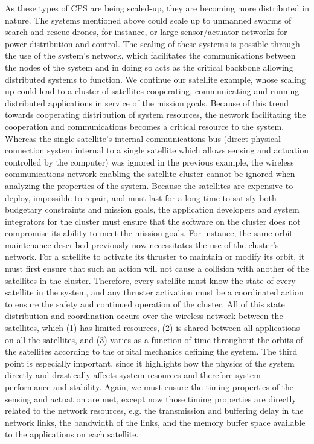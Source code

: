 As these types of CPS are being scaled-up, they are becoming more distributed in nature.  The systems mentioned above could scale up to unmanned swarms of search and rescue drones, for instance, or large sensor/actuator networks for power distribution and control.  The scaling of these systems is possible through the use of the system's network, which facilitates the communications between the nodes of the system and in doing so acts as the critical backbone allowing distributed systems to function.  We continue our satellite example, whose scaling up could lead to a cluster of satellites cooperating, communicating and running distributed applications in service of the mission goals.  Because of this trend towards cooperating distribution of system resources, the network facilitating the cooperation and communications becomes a critical resource to the system.  Whereas the single satellite's internal communications bus (direct physical connection system internal to a single satellite which allows sensing and actuation controlled by the computer) was ignored in the previous example, the wireless communications network enabling the satellite cluster cannot be ignored when analyzing the properties of the system.  Because the satellites are expensive to deploy, impossible to repair, and must last for a long time to satisfy both budgetary constraints and mission goals, the application developers and system integrators for the cluster must ensure that the software on the cluster does not compromise its ability to meet the mission goals.  For instance, the same orbit maintenance described previously now necessitates the use of the cluster's network.  For a satellite to activate its thruster to maintain or modify its orbit, it must first ensure that such an action will not cause a collision with another of the satellites in the cluster.  Therefore, every satellite must know the state of every satellite in the system, and any thruster activation must be a coordinated action to ensure the safety and continued operation of the cluster.  All of this state distribution and coordination occurs over the wireless network between the satellites, which (1) has limited resources, (2) is shared between all applications on all the satellites, and (3) varies as a function of time throughout the orbits of the satellites according to the orbital mechanics defining the system.  The third point is especially important, since it highlights how the physics of the system directly and drastically affects system resources and therefore system performance and stability.  Again, we must ensure the timing properties of the sensing and actuation are met, except now those timing properties are directly related to the network resources, e.g. the transmission and buffering delay in the network links, the bandwidth of the links, and the memory buffer space available to the applications on each satellite.

